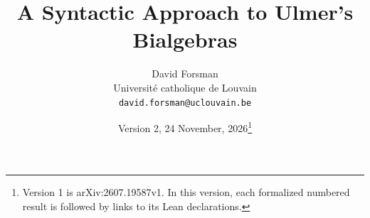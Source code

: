 \documentclass[11pt]{article}
\author{David Forsman\\
Université catholique de Louvain\\
\texttt{david.forsman@uclouvain.be}}
\title{A Syntactic Approach to Ulmer's Bialgebras}
\date{Version 2, 24 November, 2026\thanks{Version 1 is arXiv:2607.19587v1. In this version, each formalized numbered result is followed by links to its Lean declarations.}}
\begin{document}
\maketitle















{\footnotesize

}
\end{document}
